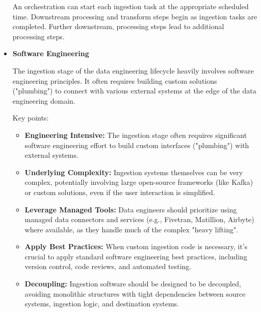\begin{itemize}
    An orchestration can start each ingestion task at the appropriate
    scheduled time. Downstream processing and transform steps begin
    as ingestion tasks are completed. Further downstream, processing
    steps lead to additional processing 
    steps.

    \item \textbf{Software Engineering}
    
    \noindent
    The ingestion stage of the data engineering lifecycle heavily
    involves software engineering principles. It often requires
    building custom solutions ("plumbing") to connect with various
    external systems at the edge of the data engineering domain.

    Key points: 
    \begin{itemize}
        \item \textbf{Engineering Intensive:} The ingestion stage
        often requires significant software engineering effort to
        build custom interfaces ("plumbing") with external systems.
    
        \item \textbf{Underlying Complexity:} Ingestion systems
        themselves can be very complex, potentially involving large
        open-source frameworks (like Kafka) or custom solutions,
        even if the user interaction is simplified.
    
        \item \textbf{Leverage Managed Tools:} Data engineers should
        prioritize using managed data connectors and services
        (e.g., Fivetran, Matillion, Airbyte) where available, as
        they handle much of the complex "heavy lifting".
    
        \item \textbf{Apply Best Practices:} When custom ingestion
        code is necessary, it's crucial to apply standard software
        engineering best practices, including version control, code
        reviews, and automated testing.
    
        \item \textbf{Decoupling:} Ingestion software should be
        designed to be decoupled, avoiding monolithic structures
        with tight dependencies between source systems, ingestion
        logic, and destination systems.
    \end{itemize}
\end{itemize}





